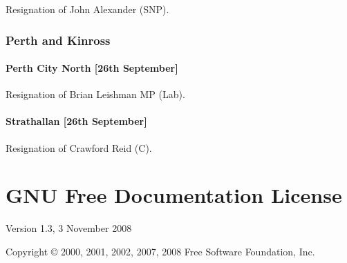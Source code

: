 \documentclass[a4paper,openany]{book}
\begin{document}
\begin{resultsiii}

Resignation of John Alexander (SNP).

\subsection*{Perth and Kinross}

\subsubsection*{Perth City North \hspace*{\fill}\nolinebreak[1]%
	\enspace\hspace*{\fill}
	[26th September]}


Resignation of Brian Leishman MP (Lab).

\subsubsection*{Strathallan \hspace*{\fill}\nolinebreak[1]%
	\enspace\hspace*{\fill}
	[26th September]}


Resignation of Crawford Reid (C).

\end{resultsiii}

\clearpage
{}
{\scriptsize%
\frenchspacing\printindex}
\thispagestyle{plain}

\chapter*{{GNU Free Documentation License}}
\pagestyle{plain}

 Version 1.3, 3 November 2008


 Copyright \copyright{} 2000, 2001, 2002, 2007, 2008 Free Software Foundation, Inc.

 \bigskip
\end{document}
